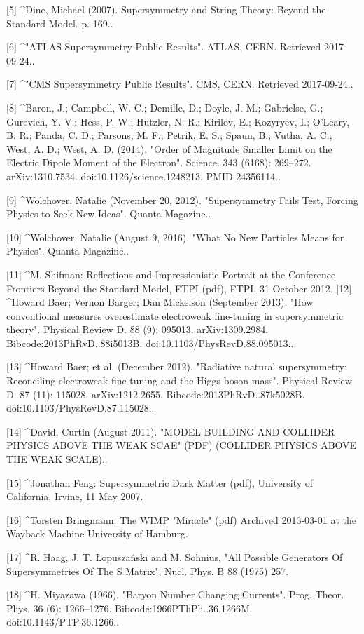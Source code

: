 [5]
^Dine, Michael (2007). Supersymmetry and String Theory: Beyond the Standard Model. p. 169..

[6]
^"ATLAS Supersymmetry Public Results". ATLAS, CERN. Retrieved 2017-09-24..

[7]
^"CMS Supersymmetry Public Results". CMS, CERN. Retrieved 2017-09-24..

[8]
^Baron, J.; Campbell, W. C.; Demille, D.; Doyle, J. M.; Gabrielse, G.; Gurevich, Y. V.; Hess, P. W.; Hutzler, N. R.; Kirilov, E.; Kozyryev, I.; O'Leary, B. R.; Panda, C. D.; Parsons, M. F.; Petrik, E. S.; Spaun, B.; Vutha, A. C.; West, A. D.; West, A. D. (2014). "Order of Magnitude Smaller Limit on the Electric Dipole Moment of the Electron". Science. 343 (6168): 269–272. arXiv:1310.7534. doi:10.1126/science.1248213. PMID 24356114..

[9]
^Wolchover, Natalie (November 20, 2012). "Supersymmetry Fails Test, Forcing Physics to Seek New Ideas". Quanta Magazine..

[10]
^Wolchover, Natalie (August 9, 2016). "What No New Particles Means for Physics". Quanta Magazine..

[11]
^M. Shifman: Reflections and Impressionistic Portrait at the Conference Frontiers Beyond the Standard Model, FTPI (pdf), FTPI, 31 October 2012.
[12]
^Howard Baer; Vernon Barger; Dan Mickelson (September 2013). "How conventional measures overestimate electroweak fine-tuning in supersymmetric theory". Physical Review D. 88 (9): 095013. arXiv:1309.2984. Bibcode:2013PhRvD..88i5013B. doi:10.1103/PhysRevD.88.095013..

[13]
^Howard Baer; et al. (December 2012). "Radiative natural supersymmetry: Reconciling electroweak fine-tuning and the Higgs boson mass". Physical Review D. 87 (11): 115028. arXiv:1212.2655. Bibcode:2013PhRvD..87k5028B. doi:10.1103/PhysRevD.87.115028..

[14]
^David, Curtin (August 2011). "MODEL BUILDING AND COLLIDER PHYSICS ABOVE THE WEAK SCAE" (PDF) (COLLIDER PHYSICS ABOVE THE WEAK SCALE)..

[15]
^Jonathan Feng: Supersymmetric Dark Matter (pdf), University of California, Irvine, 11 May 2007.

[16]
^Torsten Bringmann: The WIMP "Miracle" (pdf) Archived 2013-03-01 at the Wayback Machine University of Hamburg.

[17]
^R. Haag, J. T. Łopuszański and M. Sohnius, "All Possible Generators Of Supersymmetries Of The S Matrix", Nucl. Phys. B 88 (1975) 257.

[18]
^H. Miyazawa (1966). "Baryon Number Changing Currents". Prog. Theor. Phys. 36 (6): 1266–1276. Bibcode:1966PThPh..36.1266M. doi:10.1143/PTP.36.1266..

